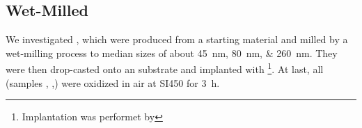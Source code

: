 	\subsection{Wet-Milled \HPHT \Nds}\label{subsec::milled_hpht_nds}
	We investigated \nds, which were produced from a \HPHT starting material and milled by a wet-milling process to median sizes of about \SIlist{45;80;260}{nm}.
	They were then drop-casted onto an \ir substrate and implanted with   \footnote{Implantation was performet by \rogalla}.
	At last, all \HPHT \nds (samples \hphtimpfortyfive, \hphtimpeighty,\hphtimptwosixty) were oxidized in air at SI{450}{\celsius} for \SI{3}{\hour}.
	\\

